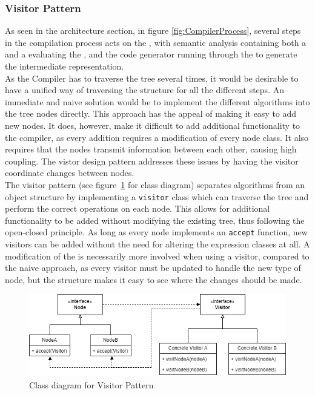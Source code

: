 \subsubsection{Visitor Pattern}
\label{sec:VisitorDesign}

As seen in the architecture section, in figure \ref{fig:CompilerProcess}, several
steps in the compilation process acts on the \ast{}, with semantic analysis
containing both a \typeChecker{} and a \borrowChecker{} evaluating the \ast{}, and
the code generator running through the \ast{} to generate the intermediate
representation.\\

As the Compiler has to traverse the tree several times, it would be desirable to have
a unified way of traversing the structure for all the different steps. An immediate
and naive solution would be to implement the different algorithms into the tree nodes
directly. This approach has the appeal of making it easy to add new nodes. It does,
however, make it difficult to add additional functionality to the compiler, as every
addition requires a modification of every node class. It also requires that the nodes
transmit information between each other, causing high coupling. The vistor design
pattern addresses these issues by having the visitor coordinate changes between
nodes. \\

The visitor pattern (see figure~\ref{fig:VisitorClassDiagram} for class diagram) separates algorithms from an object structure by implementing a
\texttt{visitor} class which can traverse the tree and perform the correct operations on
each node. This allows for additional functionality to be added without modifying
the existing tree, thus following the open-closed principle. As long as every node
implements an \texttt{accept} function, new visitors can be added without the need for
altering the expression classes at all. A modification of the \ast{} is necessarily
more involved when using a visitor, compared to the naive approach, as every visitor
must be updated to handle the new type of node, but the structure makes it easy to
see where the changes should be made. 

\newpage

\begin{figure}[h]
\includegraphics[width=\textwidth]{02-Body/Images/VisitorClassDiag.png}
\caption{Class diagram for Visitor Pattern}
\label{fig:VisitorClassDiagram}
\end{figure}

